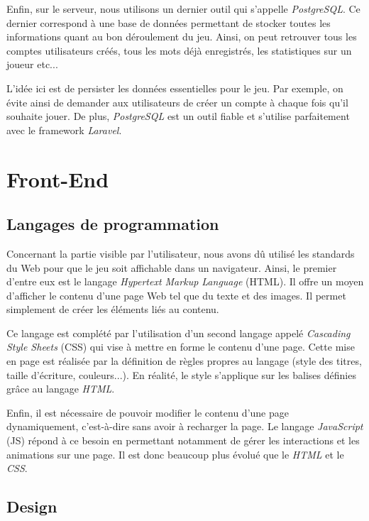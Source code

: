 \documentclass{tnreport}
\begin{document}
Enfin, sur le serveur, nous utilisons un dernier outil qui s'appelle \textit{PostgreSQL}. Ce dernier correspond à une base de données permettant de stocker toutes les informations quant au bon déroulement du jeu. Ainsi, on peut retrouver tous les comptes utilisateurs créés, tous les mots déjà enregistrés, les statistiques sur un joueur etc... 

L'idée ici est de persister les données essentielles pour le jeu. Par exemple, on évite ainsi de demander aux utilisateurs de créer un compte à chaque fois qu'il souhaite jouer. De plus, \textit{PostgreSQL} est un outil fiable et s'utilise parfaitement avec le framework \textit{Laravel}. 

\section{Front-End}

\subsection{Langages de programmation}

Concernant la partie visible par l'utilisateur, nous avons dû utilisé les standards du Web pour que le jeu soit affichable dans un navigateur. Ainsi, le premier d'entre eux est le langage \textit{Hypertext Markup Language} (HTML). Il offre un moyen d'afficher le contenu d'une page Web tel que du texte et des images. Il permet simplement de créer les éléments liés au contenu.

Ce langage est complété par l'utilisation d'un second langage appelé \textit{Cascading Style Sheets} (CSS) qui vise à mettre en forme le contenu d'une page. Cette mise en page est réalisée par la définition de règles propres au langage (style des titres, taille d'écriture, couleurs...). En réalité, le style s'applique sur les balises définies grâce au langage \textit{HTML}. 

Enfin, il est nécessaire de pouvoir modifier le contenu d'une page dynamiquement, c'est-à-dire sans avoir à recharger la page. Le langage \textit{JavaScript} (JS) répond à ce besoin en permettant notamment de gérer les interactions et les animations sur une page. Il est donc beaucoup plus évolué que le \textit{HTML} et le \textit{CSS}.

\subsection{Design}
\end{document}
